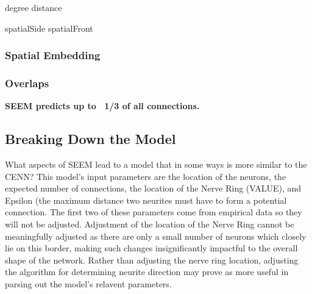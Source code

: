 {degree}
{distance}



{spatialSide}
{spatialFront}

\subsubsection{Spatial Embedding}
\subsubsection{Overlaps}

\textbf{SEEM predicts up to ~1/3 of all connections.}

\subsection{Breaking Down the Model}
What aspects of SEEM lead to a model that in some ways is more similar to the CENN? This model's input parameters are the location of the neurons, the expected number of connections, the location of the Nerve Ring (VALUE), and Epsilon (the maximum distance two neurites must have to form a potential connection. The first two of these parameters come from empirical data so they will not be adjusted. Adjustment of the location of the Nerve Ring cannot be meaningfully adjusted as there are only a small number of neurons which closely lie on this border, making such changes insignificantly impactful to the overall shape of the network. Rather than adjusting the nerve ring location, adjusting the algorithm for determining neurite direction may prove as more useful in parsing out the model's relavent parameters. 

